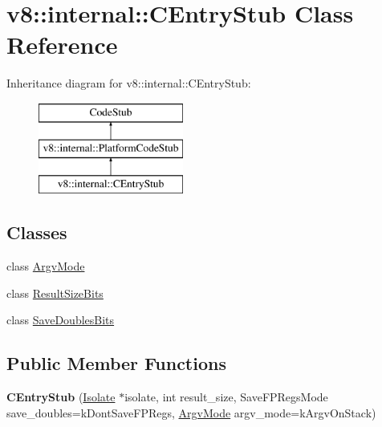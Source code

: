 \hypertarget{classv8_1_1internal_1_1_c_entry_stub}{}\section{v8\+:\+:internal\+:\+:C\+Entry\+Stub Class Reference}
\label{classv8_1_1internal_1_1_c_entry_stub}
Inheritance diagram for v8\+:\+:internal\+:\+:C\+Entry\+Stub\+:\begin{figure}[H]
\begin{center}
\leavevmode
\includegraphics[height=3.000000cm]{classv8_1_1internal_1_1_c_entry_stub}
\end{center}
\end{figure}
\subsection*{Classes}
\begin{DoxyCompactItemize}
\item 
class \hyperlink{classv8_1_1internal_1_1_c_entry_stub_1_1_argv_mode}{Argv\+Mode}
\item 
class \hyperlink{classv8_1_1internal_1_1_c_entry_stub_1_1_result_size_bits}{Result\+Size\+Bits}
\item 
class \hyperlink{classv8_1_1internal_1_1_c_entry_stub_1_1_save_doubles_bits}{Save\+Doubles\+Bits}
\end{DoxyCompactItemize}
\subsection*{Public Member Functions}
\begin{DoxyCompactItemize}
\item 
{\bfseries C\+Entry\+Stub} (\hyperlink{classv8_1_1internal_1_1_isolate}{Isolate} $\ast$isolate, int result\+\_\+size, Save\+F\+P\+Regs\+Mode save\+\_\+doubles=k\+Dont\+Save\+F\+P\+Regs, \hyperlink{classv8_1_1internal_1_1_c_entry_stub_1_1_argv_mode}{Argv\+Mode} argv\+\_\+mode=k\+Argv\+On\+Stack)\hypertarget{classv8_1_1internal_1_1_c_entry_stub_a34eb96b8bc871bfeb7b2ac4840e9b3cb}{}\label{classv8_1_1internal_1_1_c_entry_stub_a34eb96b8bc871bfeb7b2ac4840e9b3cb}

\end{DoxyCompactItemize}
